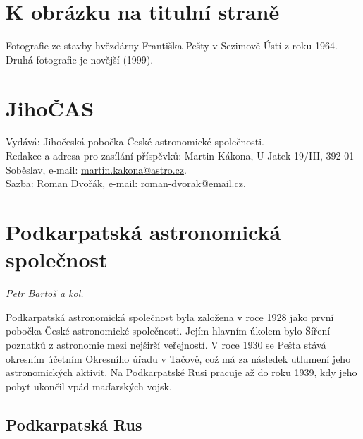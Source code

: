 \documentclass[10pt,a5paper,twoside]{book}
\newcommand{\autor}[1]{
	\begin{flushright}
	\textit{#1}
	\end{flushright}
}
\begin{document}
 

%



\section*{K obrázku na titulní straně}
Fotografie ze stavby hvězdárny Františka Pešty v Sezimově Ústí z roku 1964. Druhá fotografie je novější (1999).
\vfill
\section*{JihoČAS}
Vydává: Jihočeská pobočka České astronomické společnosti.\\
Redakce a adresa pro zasílání příspěvků: Martin Kákona, U Jatek 19/III, 392 01 Soběslav, e-mail: \href{mailto:martin.kakona@astro.cz}{martin.kakona@astro.cz}.\\
Sazba: Roman Dvořák, e-mail: \href{mailto:roman-dvorak@email.cz}{roman-dvorak@email.cz}.\newpage



\section*{Podkarpatská astronomická společnost}
\autor{Petr Bartoš a kol.}

Podkarpatská astronomická společnost byla založena v roce 1928 jako první pobočka České astronomické společnosti. Jejím hlavním úkolem bylo Šíření poznatků z astronomie mezi nejširší veřejností. V roce 1930 se Pešta stává okresním účetním Okresního úřadu v Tačově, což má za následek utlumení jeho astronomických aktivit. Na Podkarpatské Rusi pracuje až do roku 1939, kdy jeho pobyt ukončil vpád maďarských vojsk.


\subsection*{Podkarpatská Rus}
\end{document}
